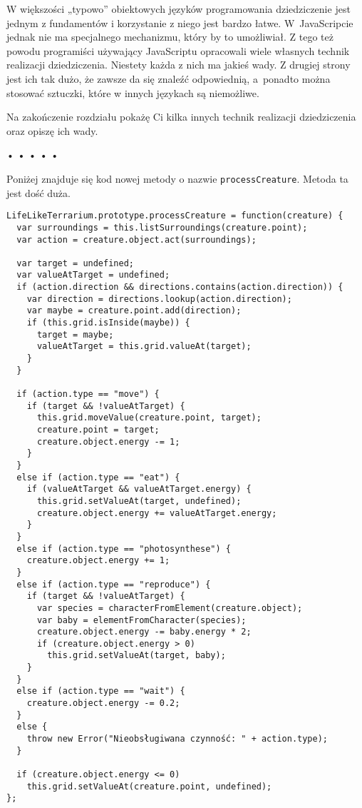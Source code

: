   
W większości „typowo” obiektowych języków programowania dziedziczenie jest jednym z fundamentów i korzystanie z niego jest bardzo łatwe. W~JavaScripcie jednak nie ma specjalnego mechanizmu, który by to umożliwiał. Z tego też powodu programiści używający JavaScriptu opracowali wiele własnych technik realizacji dziedziczenia. Niestety każda z nich ma jakieś wady. Z drugiej strony jest ich tak dużo, że zawsze da się znaleźć odpowiednią, a~ponadto można stosować sztuczki, które w innych językach są niemożliwe.

  
Na zakończenie rozdziału pokażę Ci kilka innych technik realizacji dziedziczenia oraz opiszę ich wady.



\begin{center}
• • • • •
\end{center}

  
Poniżej znajduje się kod nowej metody o nazwie \texttt{processCreature}. Metoda ta jest dość duża.

  
\begin{verbatim} 
LifeLikeTerrarium.prototype.processCreature = function(creature) {
  var surroundings = this.listSurroundings(creature.point);
  var action = creature.object.act(surroundings);

  var target = undefined;
  var valueAtTarget = undefined;
  if (action.direction && directions.contains(action.direction)) {
    var direction = directions.lookup(action.direction);
    var maybe = creature.point.add(direction);
    if (this.grid.isInside(maybe)) {
      target = maybe;
      valueAtTarget = this.grid.valueAt(target);
    }
  }

  if (action.type == "move") {
    if (target && !valueAtTarget) {
      this.grid.moveValue(creature.point, target);
      creature.point = target;
      creature.object.energy -= 1;
    }
  }
  else if (action.type == "eat") {
    if (valueAtTarget && valueAtTarget.energy) {
      this.grid.setValueAt(target, undefined);
      creature.object.energy += valueAtTarget.energy;
    }
  }
  else if (action.type == "photosynthese") {
    creature.object.energy += 1;
  }
  else if (action.type == "reproduce") {
    if (target && !valueAtTarget) {
      var species = characterFromElement(creature.object);
      var baby = elementFromCharacter(species);
      creature.object.energy -= baby.energy * 2;
      if (creature.object.energy > 0)
        this.grid.setValueAt(target, baby);
    }
  }
  else if (action.type == "wait") {
    creature.object.energy -= 0.2;
  }
  else {
    throw new Error("Nieobsługiwana czynność: " + action.type);
  }

  if (creature.object.energy <= 0)
    this.grid.setValueAt(creature.point, undefined);
};
 \end{verbatim}
  
